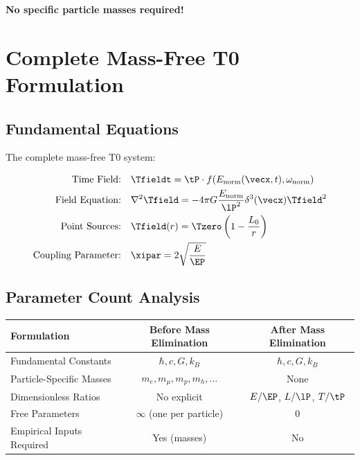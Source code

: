 	\textbf{No specific particle masses required!}
	
	\section{Complete Mass-Free T0 Formulation}
	\label{sec:complete_formulation}
	
	\subsection{Fundamental Equations}
	\label{subsec:fundamental_equations}
	
	The complete mass-free T0 system:
	
	\begin{tcolorbox}[colback=blue!5!white,colframe=blue!75!black,title=Mass-Free T0 Model]
		\begin{align}
			\text{Time Field:} \quad &\Tfieldt = \tP \cdot f(E_{\text{norm}}(\vecx,t), \omega_{\text{norm}}) \\
			\text{Field Equation:} \quad &\nabla^2 \Tfield = -4\pi G \frac{E_{\text{norm}}}{\lP^2} \delta^3(\vecx) \Tfield^2 \\
			\text{Point Sources:} \quad &\Tfield(r) = \Tzero\left(1 - \frac{L_0}{r}\right) \\
			\text{Coupling Parameter:} \quad &\xipar = 2\sqrt{\frac{E}{\EP}}
		\end{align}
	\end{tcolorbox}
	
	\subsection{Parameter Count Analysis}
	\label{subsec:parameter_count}
	
	\begin{center}
		\begin{tabular}{|l|c|c|}
			\hline
			\textbf{Formulation} & \textbf{Before Mass Elimination} & \textbf{After Mass Elimination} \\
			\hline
			\hline
			Fundamental Constants & $\hbar, c, G, k_B$ & $\hbar, c, G, k_B$ \\
			\hline
			Particle-Specific Masses & $m_e, m_\mu, m_p, m_h, \ldots$ & None \\
			\hline
			Dimensionless Ratios & No explicit & $E/\EP$, $L/\lP$, $T/\tP$ \\
			\hline
			Free Parameters & $\infty$ (one per particle) & 0 \\
			\hline
			Empirical Inputs Required & Yes (masses) & No \\
			\hline
		\end{tabular}
	\end{center}
	
